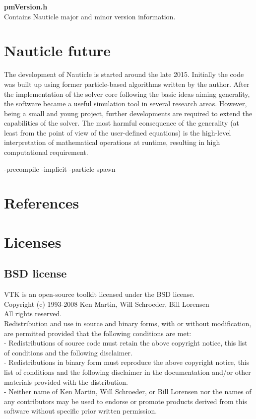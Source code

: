 \documentclass[a4paper,12pt,openany]{book}
\theoremstyle{break}
\begin{document}
\textbf{pmVersion.h}\\
Contains Nauticle major and minor version information.\\

\section{Nauticle future}
The development of Nauticle is started around the late 2015. Initially the code was built up using former particle-based algorithms written by the author. After the implementation of the solver core following the basic ideas aiming generality, the software became a useful simulation tool in several research areas. However, being a small and young project, further developments are required to extend the capabilities of the solver.
The most harmful consequence of the generality (at least from the point of view of the user-defined equations) is the high-level interpretation of mathematical operations at runtime, resulting in high computational requirement.

-precompile
-implicit
-particle spawn

\section{References}

\section{Licenses}
\subsection{BSD license}
VTK is an open-source toolkit licensed under the BSD license.\\
Copyright (c) 1993-2008 Ken Martin, Will Schroeder, Bill Lorensen \\
All rights reserved.\\
Redistribution and use in source and binary forms, with or without modification, are permitted provided that the following conditions are met: \\
- Redistributions of source code must retain the above copyright notice, this list of conditions and the following disclaimer. \\
- Redistributions in binary form must reproduce the above copyright notice, this list of conditions and the following disclaimer in the documentation and/or other materials provided with the distribution. \\
- Neither name of Ken Martin, Will Schroeder, or Bill Lorensen nor the names of any contributors may be used to endorse or promote products derived from this software without specific prior written permission.\\
\end{document}
